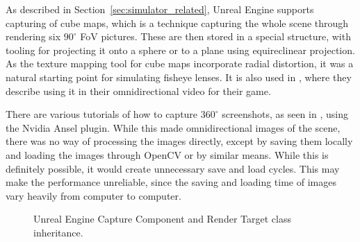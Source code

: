 As described in Section~\ref{sec:simulator_related}, Unreal Engine supports capturing of cube maps, which is a technique capturing the whole scene through rendering six $90^\circ$ FoV pictures. These are then stored in a special structure, with tooling for projecting it onto a sphere or to a plane using equireclinear projection. As the texture mapping tool for cube maps incorporate radial distortion, it was a natural starting point for simulating fisheye lenses. It is also used in \cite{UnrealCubeCapture}, where they describe using it in their omnidirectional video for their game.

There are various tutorials of how to capture $360^\circ$ screenshots, as seen in \cite{SceenshotsAnsel}, using the Nvidia Ansel plugin. While this made omnidirectional images of the scene, there was no way of processing the images directly, except by saving them locally and loading the images through OpenCV or by similar means. While this is definitely possible, it would create unnecessary save and load cycles. This may make the performance unreliable, since the saving and loading time of images vary heavily from computer to computer.

\begin{figure}[!htb]
    \centering
    \caption{Unreal Engine Capture Component and Render Target class inheritance.}
    \label{fig:capture_render_inherit}
\end{figure}


